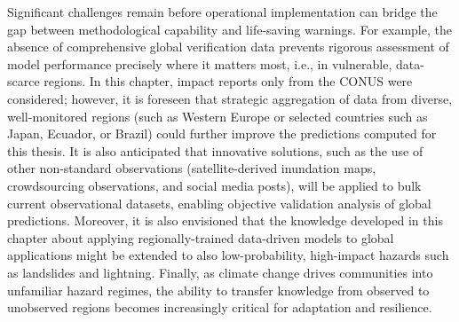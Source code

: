 Significant challenges remain before operational implementation can bridge the gap between methodological capability and life-saving warnings. For example, the absence of comprehensive global verification data prevents rigorous assessment of model performance precisely where it matters most, i.e., in vulnerable, data-scarce regions. In this chapter, impact reports only from the CONUS were considered; however, it is foreseen that strategic aggregation of data from diverse, well-monitored regions (such as Western Europe or selected countries such as Japan, Ecuador, or Brazil) could further improve the predictions computed for this thesis. It is also anticipated that innovative solutions, such as the use of other non-standard observations (satellite-derived inundation maps, crowdsourcing observations, and social media posts), will be applied to bulk current observational datasets, enabling objective validation analysis of global predictions. Moreover, it is also envisioned that the knowledge developed in this chapter about applying regionally-trained data-driven models to global applications might be extended to also low-probability, high-impact hazards such as landslides and lightning. Finally, as climate change drives communities into unfamiliar hazard regimes, the ability to transfer knowledge from observed to unobserved regions becomes increasingly critical for adaptation and resilience.